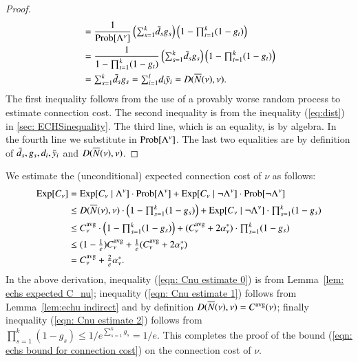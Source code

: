 \begin{proof}
\begin{align*}
  &= \frac{1}{\mbox{\rm Prob}[\Lambda^\nu]} \left(\textstyle{\sum_{s=1}^k} {\bar d}_s g_s\right)
  \left(1 - \textstyle{\prod_{t=1}^k} (1-g_t)\right)\\
  &= \frac{1}{1 - \textstyle{\prod_{t=1}^k} (1-g_t)}
  \left(\textstyle{\sum_{s=1}^k} {\bar d}_s g_s\right) 
  \left(1 - \textstyle{\prod_{t=1}^k} (1-g_t)\right)
  \\
  &=\textstyle{\sum_{s=1}^k} {\bar d}_s g_s 
  = \textstyle{\sum_{i=1}^l} d_i {\bar y}_i = D({\overline{N}}(\nu), \nu).\\
\end{align*}
The first inequality follows from the use of a provably worse random
process to estimate connection cost. The second inequality is from the
inequality (\ref{eq:dist}) in \ref{sec: ECHSinequality}. The third
line, which is an equality, is by algebra. In the fourth line we
substitute in $\mbox{\rm Prob}[\Lambda^\nu]$. The last two equalities are by
definition of ${\bar d}_s, g_s, d_i, {\bar y}_i$ and $D({\overline{N}}(\nu), \nu)$.
\end{proof}

We estimate the (unconditional) expected connection cost of $\nu$ as
follows:
%
\begin{align}
  \notag
  \mbox{\rm Exp}[C_\nu] &= \mbox{\rm Exp}[C_{\nu} \mid \Lambda^\nu] \cdot
  \mbox{\rm Prob}[\Lambda^\nu] + \mbox{\rm Exp}[C_{\nu} \mid \neg \Lambda^\nu] \cdot
  \mbox{\rm Prob}[\neg \Lambda^\nu]
  \\
  &\leq D({\overline{N}}(\nu), \nu) \cdot \left(1 - \textstyle{\prod_{s=1}^k}
  (1-g_s)\right) + \mbox{\rm Exp}[C_{\nu} \mid \neg \Lambda^\nu] \cdot \textstyle{\prod_{s=1}^k}
  (1-g_s)
  \label{eqn: Cnu estimate 0}
  \\
  &\leq C^{{\mbox{\scriptsize\rm avg}}}_{\nu} \cdot \left(1 - \textstyle{\prod_{s=1}^k}
  (1-g_s)\right) + (C^{{\mbox{\scriptsize\rm avg}}}_{\nu} + 2\alpha_{\nu}^\ast) \cdot \textstyle{\prod_{s=1}^k}
  (1-g_s)
  \label{eqn: Cnu estimate 1}
  \\
   & \leq \textstyle (1-\frac{1}{e}) C^{{\mbox{\scriptsize\rm avg}}}_{\nu} 
	+	\frac{1}{e}	(C^{{\mbox{\scriptsize\rm avg}}}_{\nu} + 2\alpha_{\nu}^\ast) 
		\label{eqn: Cnu estimate 2}
	\\
	&= \textstyle C^{{\mbox{\scriptsize\rm avg}}}_{\nu} + \frac{2}{e}\alpha_{\nu}^\ast.
	\notag
\end{align}
%
In the above derivation, inequality (\ref{eqn: Cnu estimate 0}) is
from Lemma~\ref{lem: echs expected C_nu}; inequality (\ref{eqn: Cnu
  estimate 1}) follows from Lemma~\ref{lem:echu indirect} and by
definition $D({\overline{N}}(\nu), \nu) = C^{{\mbox{\scriptsize\rm avg}}}(\nu)$; finally inequality
(\ref{eqn: Cnu estimate 2}) follows from $\prod_{s=1}^{k} (1-g_s)\le
1/e^{\sum_{s=1}^k g_s} = 1/e$.  This completes the proof of the bound
(\ref{eqn: echs bound for connection cost}) on the connection cost of
$\nu$.

